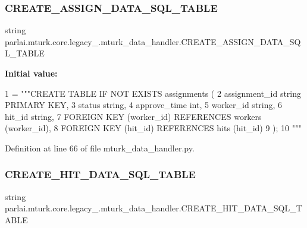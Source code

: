 \subsubsection{\texorpdfstring{C\+R\+E\+A\+T\+E\+\_\+\+A\+S\+S\+I\+G\+N\+\_\+\+D\+A\+T\+A\+\_\+\+S\+Q\+L\+\_\+\+T\+A\+B\+LE}{CREATE\_ASSIGN\_DATA\_SQL\_TABLE}}
{\footnotesize\ttfamily string parlai.\+mturk.\+core.\+legacy\+\_.\+mturk\+\_\+data\+\_\+handler.\+C\+R\+E\+A\+T\+E\+\_\+\+A\+S\+S\+I\+G\+N\+\_\+\+D\+A\+T\+A\+\_\+\+S\+Q\+L\+\_\+\+T\+A\+B\+LE}

{\bfseries Initial value\+:}
\begin{DoxyCode}
1 =  \textcolor{stringliteral}{"""CREATE TABLE IF NOT EXISTS assignments (}
2 \textcolor{stringliteral}{        assignment\_id string PRIMARY KEY,}
3 \textcolor{stringliteral}{        status string,}
4 \textcolor{stringliteral}{        approve\_time int,}
5 \textcolor{stringliteral}{        worker\_id string,}
6 \textcolor{stringliteral}{        hit\_id string,}
7 \textcolor{stringliteral}{        FOREIGN KEY (worker\_id) REFERENCES workers (worker\_id),}
8 \textcolor{stringliteral}{        FOREIGN KEY (hit\_id) REFERENCES hits (hit\_id)}
9 \textcolor{stringliteral}{    );}
10 \textcolor{stringliteral}{    """}
\end{DoxyCode}


Definition at line 66 of file mturk\+\_\+data\+\_\+handler.\+py.

\mbox{\label{namespaceparlai_1_1mturk_1_1core_1_1legacy__2018_1_1mturk__data__handler_ac5bfadfe5e832bc603c3449606b02fff}} 
\subsubsection{\texorpdfstring{C\+R\+E\+A\+T\+E\+\_\+\+H\+I\+T\+\_\+\+D\+A\+T\+A\+\_\+\+S\+Q\+L\+\_\+\+T\+A\+B\+LE}{CREATE\_HIT\_DATA\_SQL\_TABLE}}
{\footnotesize\ttfamily string parlai.\+mturk.\+core.\+legacy\+\_.\+mturk\+\_\+data\+\_\+handler.\+C\+R\+E\+A\+T\+E\+\_\+\+H\+I\+T\+\_\+\+D\+A\+T\+A\+\_\+\+S\+Q\+L\+\_\+\+T\+A\+B\+LE}

